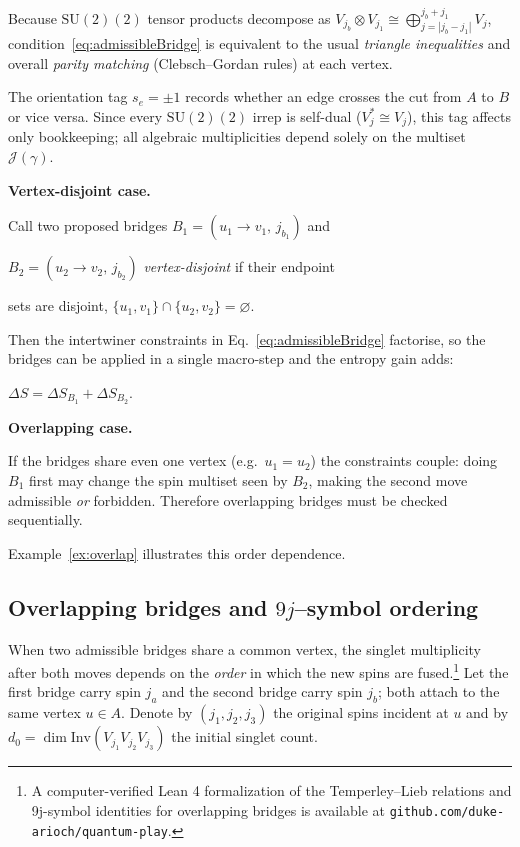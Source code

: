 \documentclass[11pt]{article}
\newcommand{\SU}{\mathrm{SU}(2)}
\newcommand{\Inv}{\mathrm{Inv}}
\newcommand{\Cut}{\gamma}
\newcommand{\JS}{\mathcal{J}} %
\begin{document}
\noindent
Because $\SU(2)$ tensor products decompose as
\(V_{j_b}\otimes V_{j_1}\cong
\bigoplus_{j=|j_b-j_1|}^{j_b+j_1}V_{j}\),
condition~\eqref{eq:admissibleBridge} is equivalent to the usual
\emph{triangle inequalities} and overall \emph{parity matching}
(Clebsch–Gordan rules) at each vertex.

\begin{remark}\label{rem:orientationBook}
  The orientation tag $s_e=\pm1$ records whether an edge crosses the cut
  from $A$ to $B$ or vice versa.  Since every $\SU(2)$ irrep is self-dual
  ($V_j^{*}\!\cong\!V_j$), this tag affects only bookkeeping; all algebraic
  multiplicities depend solely on the multiset~$\JS(\Cut)$.
\end{remark}


\begin{remark}\label{rem:simul}

  \textbf{Vertex-disjoint case.}

  Call two proposed bridges $B_1=(u_1\!\to\! v_1,\,j_{b_1})$ and

  $B_2=(u_2\!\to\! v_2,\,j_{b_2})$ \emph{vertex-disjoint} if their endpoint

  sets are disjoint, $\{u_1,v_1\}\cap\{u_2,v_2\}=\varnothing$.

  Then the intertwiner constraints in Eq.~\eqref{eq:admissibleBridge} factorise,
  so the bridges can be applied in a single macro-step and the entropy gain
  adds:

  $\Delta S=\Delta S_{B_1}+\Delta S_{B_2}$.

  \textbf{Overlapping case.}

  If the bridges share even one vertex (e.g.\ $u_1=u_2$) the constraints
  couple: doing $B_1$ first may change the spin multiset seen by $B_2$,
  making the second move admissible \emph{or} forbidden.
  Therefore overlapping bridges must be checked sequentially.

  Example~\ref{ex:overlap} illustrates this order dependence.

\end{remark}

\subsection{Overlapping bridges and $9j$--symbol ordering}
\label{subsec:overlap9j}

When two admissible bridges share a common vertex, the singlet
multiplicity after both moves depends on the \emph{order} in which the
new spins are fused.\footnote{A computer-verified Lean 4 formalization of the Temperley--Lieb relations and 9j-symbol identities for overlapping bridges is available at \texttt{github.com/duke-arioch/quantum-play}.}  Let the first bridge carry spin $j_a$ and the
second bridge carry spin $j_b$; both attach to the same vertex
$u\in A$.  Denote by $(j_1,j_2,j_3)$ the original spins incident at
$u$ and by $d_0=\dim\Inv(V_{j_1}V_{j_2}V_{j_3})$ the initial singlet
count.
\end{document}
